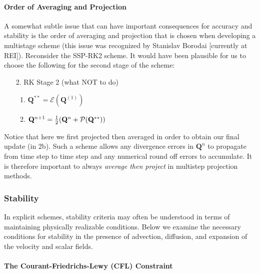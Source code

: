 \documentclass[11pt]{article}
\begin{document}
\paragraph{Order of Averaging and Projection} A somewhat subtle issue that can have important consequences for accuracy and stability is the order of averaging and projection that is chosen when developing a multistage scheme (this issue was recognized by Stanislav Borodai [currently at REI]). Reconsider the SSP-RK2 scheme. It would have been plausible for us to choose the following for the second stage of the scheme:
\begin{enumerate}
\item[2.] RK Stage 2 (what NOT to do)
    \begin{enumerate}
    \item $\mathbf{Q}^{**} = \mathcal{E}(\mathbf{Q}^{(1)})$
    \item $\mathbf{Q}^{n+1} = \mbox{$\frac{1}{2}$} (\mathbf{Q}^n + \mathcal{P}(\mathbf{Q}^{**}))$
    \end{enumerate}
\end{enumerate}
Notice that here we first projected then averaged in order to obtain our final update (in 2b).  Such a scheme allows any divergence errors in $\mathbf{Q}^n$ to propagate from time step to time step and any numerical round off errors to accumulate.  It is therefore important to always \emph{average then project} in multistep projection methods.

\subsubsection{Stability}

In explicit schemes, stability criteria may often be understood in terms of maintaining physically realizable conditions.  Below we examine the necessary conditions for stability in the presence of advection, diffusion, and expansion of the velocity and scalar fields.

\paragraph{The Courant-Friedrichs-Lewy (CFL) Constraint}
\end{document}
